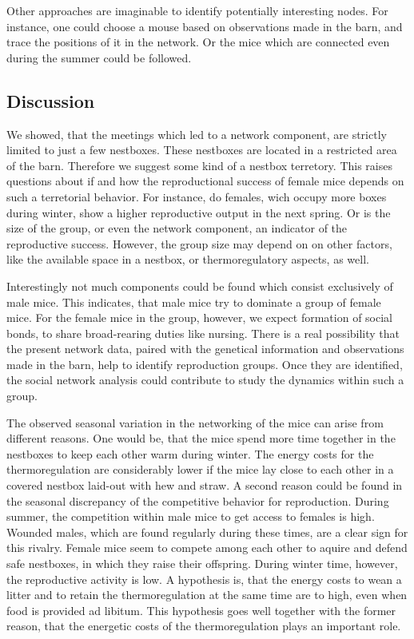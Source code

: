 Other approaches are imaginable to identify potentially interesting nodes. For instance, one could choose a mouse based on observations made in the barn, and trace the positions of it in the network. Or the mice which are connected even during the summer could be followed.

\subsection{Discussion}
\label{subsec:discussion}

We showed, that the meetings which led to a network component, are strictly limited to just a few nestboxes. These nestboxes are located in a restricted area of the barn. Therefore we suggest some kind of a nestbox terretory. This raises questions about if and how the reproductional success of female mice depends on such a terretorial behavior. For instance, do females, wich occupy more boxes during winter, show a higher reproductive output in the next spring. Or is the size of the group, or even the network component, an indicator of the reproductive success. However, the group size may depend on on other factors, like the available space in a nestbox, or thermoregulatory aspects, as well.

Interestingly not much components could be found which consist exclusively of male mice. This indicates, that male mice try to dominate a group of female mice. For the female mice in the group, however, we expect formation of social bonds, to share broad-rearing duties like nursing. There is a real possibility that the present network data, paired with the genetical information and observations made in the barn, help to identify reproduction groups. Once they are identified, the social network analysis could contribute to study the dynamics within such a group.     

The observed seasonal variation in the networking of the mice can arise from different reasons. One would be, that the mice spend more time together in the nestboxes to keep each other warm during winter. The energy costs for the thermoregulation are considerably lower if the mice lay close to each other in a covered nestbox laid-out with hew and straw. A second reason could be found in the seasonal discrepancy of the competitive behavior for reproduction. During summer, the competition within male mice to get access to females is high. Wounded males, which are found regularly during these times, are a clear sign for this rivalry. Female mice seem to compete among each other to aquire and defend safe nestboxes, in which they raise their offspring. During winter time, however, the reproductive activity is low. A hypothesis is, that the energy costs to wean a litter and to retain the thermoregulation at the same time are to high, even when food is provided ad libitum. This hypothesis goes well together with the former reason, that the energetic costs of the thermoregulation plays an important role.    


